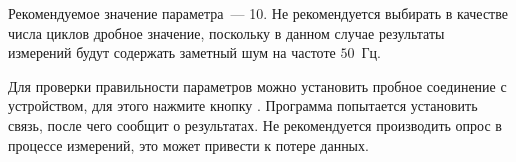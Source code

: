 Рекомендуемое значение параметра~--- 10. Не рекомендуется выбирать в качестве числа циклов дробное значение, поскольку в данном случае результаты измерений будут содержать заметный шум на частоте $50$~Гц.

\bigskip

Для проверки правильности параметров можно установить пробное соединение с устройством, для этого нажмите кнопку . Программа попытается установить связь, после чего сообщит о результатах. Не рекомендуется производить опрос в процессе измерений, это может привести к потере данных.